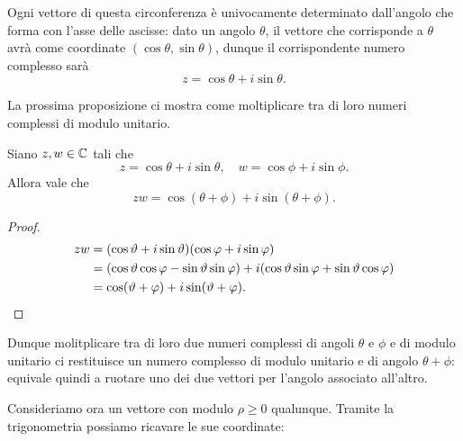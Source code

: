 Ogni vettore di questa circonferenza è univocamente determinato dall'angolo che forma con l'asse delle ascisse: dato un angolo $\theta$, il vettore che corrisponde a $\theta$ avrà come coordinate $(\cos \theta, \sin \theta)$, dunque il corrispondente numero complesso sarà \[
    z = \cos \theta + i\sin\theta.    
\]

La prossima proposizione ci mostra come moltiplicare tra di loro numeri complessi di modulo unitario.
\begin{proposition}\label{prop:product_unitary}
    Siano $z, w \in \C$ tali che \[
        z = \cos \theta + i\sin\theta, \quad w = \cos \phi + i\sin\phi.
    \]
    Allora vale che \begin{equation}
        zw = \cos (\theta + \phi) + i\sin (\theta + \phi).
    \end{equation}
\end{proposition}
\begin{proof}
    \begin{align*}
        zw &= (\cos \theta + i\sin\theta)(\cos \phi + i\sin\phi)\\
        &= (\cos \theta\cos \phi - \sin\theta\sin\phi) + i(\cos\theta\sin\phi + \sin\theta\cos\phi)\\
        &= \cos(\theta + \phi) + i\sin(\theta+\phi). \qedhere
    \end{align*}
\end{proof}

Dunque molitplicare tra di loro due numeri complessi di angoli $\theta$ e $\phi$ e di modulo unitario ci restituisce un numero complesso di modulo unitario e di angolo $\theta + \phi$: equivale quindi a ruotare uno dei due vettori per l'angolo associato all'altro.

Consideriamo ora un vettore con modulo $\rho \geq 0$ qualunque. Tramite la trigonometria possiamo ricavare le sue coordinate:
\begin{center}
\end{center}

